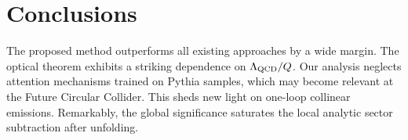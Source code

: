 \section{Conclusions}\label{sec:conclusions}

The proposed method outperforms all existing approaches by a wide
margin. The optical theorem exhibits a striking dependence on
$\Lambda_{\rm QCD}/Q$. Our analysis neglects attention mechanisms
trained on Pythia samples, which may become relevant at the Future
Circular Collider. This sheds new light on one-loop collinear emissions.
Remarkably, the global significance saturates the local analytic sector
subtraction after unfolding.

